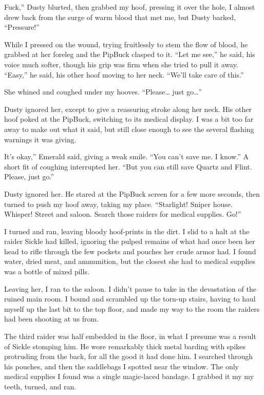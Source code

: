 \leavevmode{}Fuck,” Dusty blurted, then grabbed my hoof, pressing it over the hole, I almost drew back from the surge of warm blood that met me, but Dusty barked, “Pressure!”

While I pressed on the wound, trying fruitlessly to stem the flow of blood, he grabbed at her foreleg and the PipBuck clasped to it. “Let me see,” he said, his voice much softer, though his grip was firm when she tried to pull it away. “Easy,” he said, his other hoof moving to her neck. “We’ll take care of this.”

She whined and coughed under my hooves. “Please… just go…”

Dusty ignored her, except to give a reassuring stroke along her neck. His other hoof poked at the PipBuck, switching to its medical display. I was a bit too far away to make out what it said, but still close enough to see the several flashing warnings it was giving.

\leavevmode{}It’s okay,” Emerald said, giving a weak smile. “You can’t save me. I know.” A short fit of coughing interrupted her. “But you can still save Quartz and Flint. Please, just go.”

Dusty ignored her. He stared at the PipBuck screen for a few more seconds, then turned to push my hoof away, taking my place. “Starlight! Sniper house. Whisper! Street and saloon. Search those raiders for medical supplies. Go!”

I turned and ran, leaving bloody hoof-prints in the dirt. I slid to a halt at the raider Sickle had killed, ignoring the pulped remains of what had once been her head to rifle through the few pockets and pouches her crude armor had. I found water, dried meat, and ammunition, but the closest she had to medical supplies was a bottle of mixed pills.

Leaving her, I ran to the saloon. I didn’t pause to take in the devastation of the ruined main room. I bound and scrambled up the torn-up stairs, having to haul myself up the last bit to the top floor, and made my way to the room the raiders had been shooting at us from.

The third raider was half embedded in the floor, in what I presume was a result of Sickle stomping him. He wore remarkably thick metal barding with spikes protruding from the back, for all the good it had done him. I searched through his pouches, and then the saddlebags I spotted near the window. The only medical supplies I found was a single magic-laced bandage. I grabbed it my my teeth, turned, and ran.


